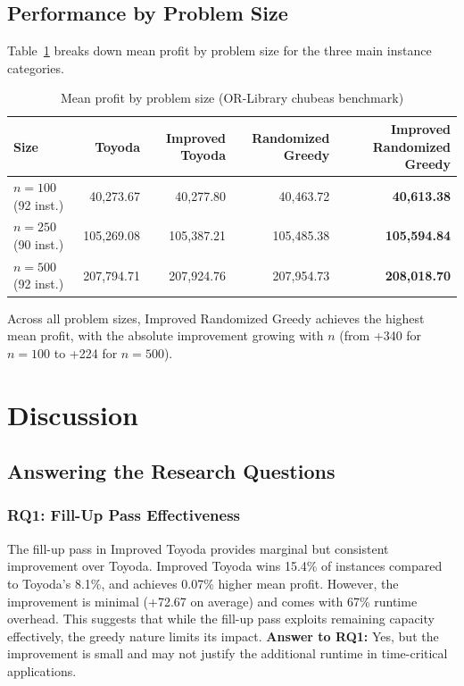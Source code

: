 \documentclass[12pt,a4paper]{article}
\begin{document}
\subsection{Performance by Problem Size}

Table~\ref{tab:by_size} breaks down mean profit by problem size for the three main instance categories.

\begin{table}[H]
\centering
\caption{Mean profit by problem size (OR-Library chubeas benchmark)}
\label{tab:by_size}
\begin{tabular}{lrrrr}
\toprule
\textbf{Size} & \textbf{Toyoda} & \textbf{Improved Toyoda} & \textbf{Randomized Greedy} & \textbf{Improved Randomized Greedy} \\
\midrule
$n = 100$ (92 inst.) & 40,273.67 & 40,277.80 & 40,463.72 & \textbf{40,613.38} \\
$n = 250$ (90 inst.) & 105,269.08 & 105,387.21 & 105,485.38 & \textbf{105,594.84} \\
$n = 500$ (92 inst.) & 207,794.71 & 207,924.76 & 207,954.73 & \textbf{208,018.70} \\
\bottomrule
\end{tabular}
\end{table}

Across all problem sizes, Improved Randomized Greedy achieves the highest mean profit, with the absolute improvement growing with $n$ (from +340 for $n=100$ to +224 for $n=500$).

\section{Discussion}
\label{sec:discussion}

\subsection{Answering the Research Questions}

\subsubsection{RQ1: Fill-Up Pass Effectiveness}

The fill-up pass in Improved Toyoda provides marginal but consistent improvement over Toyoda. Improved Toyoda wins 15.4\% of instances compared to Toyoda's 8.1\%, and achieves 0.07\% higher mean profit. However, the improvement is minimal (+72.67 on average) and comes with 67\% runtime overhead. This suggests that while the fill-up pass exploits remaining capacity effectively, the greedy nature limits its impact. \textbf{Answer to RQ1:} Yes, but the improvement is small and may not justify the additional runtime in time-critical applications.
\end{document}
